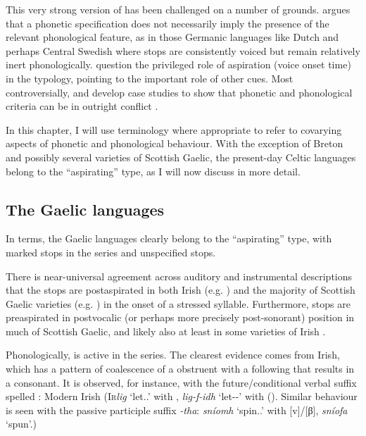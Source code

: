 \documentclass[output=paper,colorlinks,citecolor=brown]{langscibook}
\begin{document}
This very strong version of  has been challenged on a number of grounds. \Textcite{salmons2017germanic} argues that a phonetic specification does not necessarily imply the presence of the relevant phonological feature, as in those Germanic languages like Dutch  and perhaps Central Swedish  where  stops are consistently voiced but remain relatively inert phonologically. \Textcite{kirby2019effects} question the privileged role of aspiration (voice onset time) in the typology, pointing to the important role of other cues. Most controversially, \textcite{cyran13:_polis} and \textcite{iosad16} develop case studies to show that phonetic and phonological criteria can be in outright conflict \parencite[for a rejoinder, however, see][]{raimy2021privativity}.

In this chapter, I will use  terminology where appropriate to refer to covarying aspects of phonetic and phonological behaviour. With the exception of Breton and possibly several varieties of Scottish Gaelic, the present\hyp day Celtic languages belong to the \enquote{aspirating} type, as I will now discuss in more detail.

\subsection{The Gaelic languages}
\label{sec:gaelic-languages}

In  terms, the Gaelic languages clearly belong to the \enquote{aspirating} type, with marked  stops in the  series and unspecified  stops.

There is near\hyp universal agreement across auditory and instrumental descriptions that the  stops are postaspirated in both Irish (e.g. \cite{nichasaide1986preaspiration,óraghallaigh2014fuaimeanna}) and the majority of Scottish Gaelic varieties (e.g. \cite{nichasaide1986preaspiration,Nance2019}) in the onset of a stressed syllable. Furthermore,  stops are preaspirated in postvocalic (or perhaps more precisely post\hyp sonorant) position in much of Scottish Gaelic, and likely also at least in some varieties of Irish \parencite{iosad2020phonological}.

Phonologically,  is active in the  series. The clearest evidence comes from Irish, which has a pattern of coalescence of a  obstruent with a following  that results in a  consonant. It is observed, for instance, with the future\fshyp conditional verbal suffix spelled : Modern Irish (\textsc{Ir}\textit{lig} `{let.\Imp.\Ssg}' with \ipa{[ɡʲ]}, \textit{lig-f-idh} `{let-\Fut-\Tsg}' with \ipa{[kʲ]} (\cite{sommerfelt1960donegal,buachalla85:_moder_irish}). Similar behaviour is seen with the passive participle suffix \textit{-tha}: \textit{sníomh} `{spin.\Imp.\Ssg}' with [v]/[β], \textit{sníofa} `{spun}'.)
\end{document}
